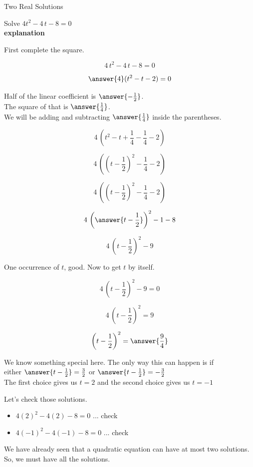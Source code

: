 \documentclass{ximera}
\begin{document}
\begin{example} Two Real Solutions

Solve $4  t^2 - 4 \, t - 8 = 0$ \\


\textbf{\textcolor{red!75!green}{explanation}} 


First complete the square.



\[ 4 \, t^2 -  4 \, t - 8 = 0 \]

\[ \answer{4} (t^2 - t - 2) = 0 \]



Half of the linear coefficient is $\answer{-\frac{1}{2}}$. \\

The square of that is $\answer{\frac{1}{4}}$. \\

We will be adding and subtracting $\answer{\frac{1}{4}}$ inside the parentheses.




\[ 4 \, (t^2 - t + \frac{1}{4} - \frac{1}{4} - 2)  \]


\[ 4 \, \left(\left(t - \frac{1}{2}\right)^2 - \frac{1}{4} - 2\right)  \]


\[ 4 \, \left(\left(t - \frac{1}{2}\right)^2 - \frac{1}{4} - 2\right)  \]

\[ 4 \, \left( \answer{t - \frac{1}{2}} \right)^2 - 1 - 8  \]

\[ 4 \, \left(t - \frac{1}{2}\right)^2 - 9  \]


One occurrence of $t$, good. Now to get $t$ by itself.

\[ 4 \, \left(t - \frac{1}{2}\right)^2 - 9 = 0  \]

\[ 4 \, \left(t - \frac{1}{2}\right)^2 = 9  \]

\[  \left(t - \frac{1}{2}\right)^2 = \answer{\frac{9}{4}}  \]

We know something special here. The only way this can happen is if \\



either   $\answer{t - \frac{1}{2}} = \frac{3}{2}$  or  $\answer{t - \frac{1}{2}} = -\frac{3}{2}$ \\

The first choice gives us $t = 2$ and the second choice gives us $t = -1$




Let's check those solutions.

\begin{itemize}
\item $4 (2)^2 - 4 (2) - 8 = 0$ ... check
\item $4 (-1)^2 - 4 (-1) - 8 = 0$ ... check
\end{itemize}



We have already seen that a quadratic equation can have at most two solutions.  So, we must have all the solutions.




\end{example}
\end{document}
